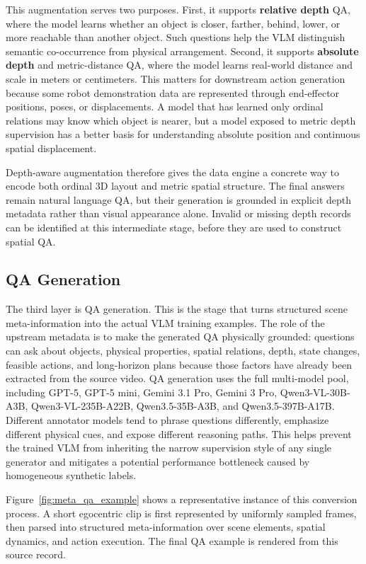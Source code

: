 \documentclass{llmxive}
\begin{document}
This augmentation serves two purposes. First, it supports \textbf{relative depth} QA, where the model learns whether an object is closer, farther, behind, lower, or more reachable than another object. Such questions help the VLM distinguish semantic co-occurrence from physical arrangement. Second, it supports \textbf{absolute depth} and metric-distance QA, where the model learns real-world distance and scale in meters or centimeters. This matters for downstream action generation because some robot demonstration data are represented through end-effector positions, poses, or displacements. A model that has learned only ordinal relations may know which object is nearer, but a model exposed to metric depth supervision has a better basis for understanding absolute position and continuous spatial displacement.

Depth-aware augmentation therefore gives the data engine a concrete way to encode both ordinal 3D layout and metric spatial structure. The final answers remain natural language QA, but their generation is grounded in explicit depth metadata rather than visual appearance alone. Invalid or missing depth records can be identified at this intermediate stage, before they are used to construct spatial QA.

\subsection{QA Generation}

The third layer is QA generation. This is the stage that turns structured scene meta-information into the actual VLM training examples. The role of the upstream metadata is to make the generated QA physically grounded: questions can ask about objects, physical properties, spatial relations, depth, state changes, feasible actions, and long-horizon plans because those factors have already been extracted from the source video. QA generation uses the full multi-model pool, including GPT-5, GPT-5 mini, Gemini 3.1 Pro, Gemini 3 Pro, Qwen3-VL-30B-A3B, Qwen3-VL-235B-A22B, Qwen3.5-35B-A3B, and Qwen3.5-397B-A17B. Different annotator models tend to phrase questions differently, emphasize different physical cues, and expose different reasoning paths. This helps prevent the trained VLM from inheriting the narrow supervision style of any single generator and mitigates a potential performance bottleneck caused by homogeneous synthetic labels.

Figure~\ref{fig:meta_qa_example} shows a representative instance of this conversion process. A short egocentric clip is first represented by uniformly sampled frames, then parsed into structured meta-information over scene elements, spatial dynamics, and action execution. The final QA example is rendered from this source record.
\end{document}

